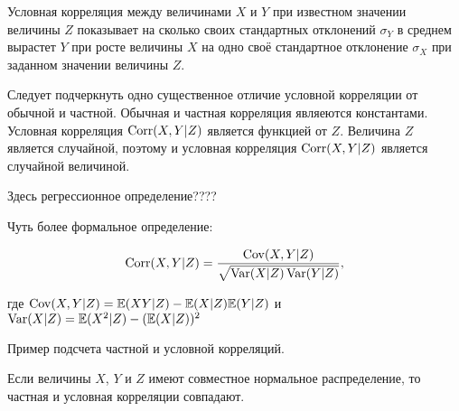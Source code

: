 \documentclass[10pt]{article}
\begin{document}
\begin{definition}
Условная корреляция между величинами $X$ и $Y$ при известном значении величины $Z$ показывает на сколько своих стандартных отклонений $\sigma_Y$ в среднем вырастет $Y$ при росте величины $X$ на одно своё стандартное отклонение $\sigma_X$ при заданном значении величины $Z$.
\end{definition}


Следует подчеркнуть одно существенное отличие условной корреляции от обычной и частной. Обычная и частная корреляция являеются константами. Условная корреляция $\operatorname{Corr}(X,Y|Z)$ является функцией от $Z$. Величина $Z$ является случайной, поэтому и условная корреляция $\operatorname{Corr}(X,Y|Z)$ является случайной величиной. 

Здесь регрессионное определение???? 

Чуть более формальное определение:

\begin{definition}
\[
\operatorname{Corr}(X,Y|Z) = \frac{\operatorname{Cov}(X,Y|Z)}{\sqrt{\operatorname{Var}(X|Z)\operatorname{Var}(Y|Z)}},
\]
\end{definition}

где $\operatorname{Cov}(X,Y|Z)=\mathbb{E}(XY|Z)-\mathbb{E}(X|Z)\mathbb{E}(Y|Z)$ и $\operatorname{Var}(X|Z)=\mathbb{E}(X^2|Z)-(\mathbb{E}(X|Z))^2$


Пример подсчета частной и условной корреляций.

\begin{theorem}
Если величины $X$, $Y$ и $Z$ имеют совместное нормальное распределение, то частная и условная корреляции совпадают.
\end{theorem}
\end{document}
